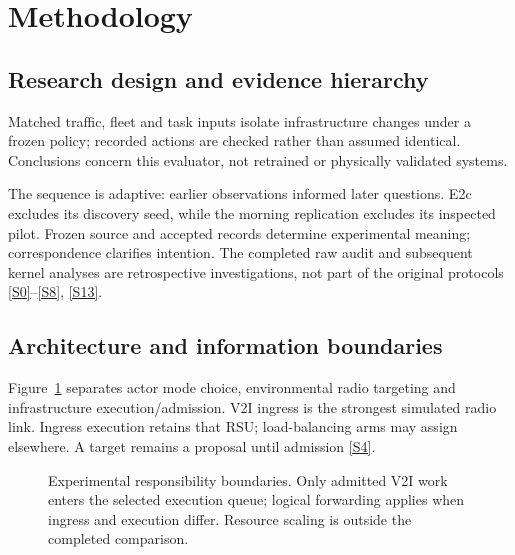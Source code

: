 \documentclass[11pt,a4paper]{article}
\begin{document}
\section{Methodology}\label{sec:2}

\subsection{Research design and evidence hierarchy}\label{sec:2.1}

Matched traffic, fleet and task inputs isolate infrastructure changes under a frozen policy; recorded actions are checked rather than assumed identical. Conclusions concern this evaluator, not retrained or physically validated systems.

The sequence is adaptive: earlier observations informed later questions. E2c excludes its discovery seed, while the morning replication excludes its inspected pilot. Frozen source and accepted records determine experimental meaning; correspondence clarifies intention. The completed raw audit and subsequent kernel analyses are retrospective investigations, not part of the original protocols \hyperref[source-s0]{[S0]}--\hyperref[source-s8]{[S8]}, \hyperref[source-s13]{[S13]}.

\subsection{Architecture and information boundaries}\label{sec:2.2}

Figure~\ref{fig:1} separates actor mode choice, environmental radio targeting and infrastructure execution/admission. V2I ingress is the strongest simulated radio link. Ingress execution retains that RSU; load-balancing arms may assign elsewhere. A target remains a proposal until admission \hyperref[source-s4]{[S4]}.

\begin{figure}[htbp]
\centering

\caption{Experimental responsibility boundaries. Only admitted V2I work enters the selected execution queue; logical forwarding applies when ingress and execution differ. Resource scaling is outside the completed comparison.}\label{fig:1}
\end{figure}
\end{document}
